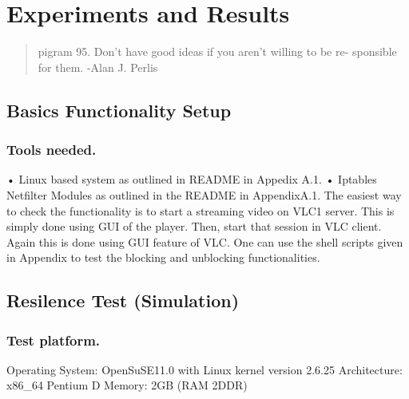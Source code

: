 \chapter{Experiments and Results}
\begin{quote}
pigram 95. Don’t have good ideas if you aren’t willing to be re-
sponsible for them.
-Alan J. Perlis
\end{quote}
\section{Basics Functionality Setup}
\subsection{Tools needed.}
• Linux based system as outlined in README in Appedix A.1.
• Iptables Netfilter Modules as outlined in the README in AppendixA.1.
The easiest way to check the functionality is to start a streaming video on VLC1
server. This is simply done using GUI of the player. Then, start that session in
VLC client. Again this is done using GUI feature of VLC. One can use the shell
scripts given in Appendix to test the blocking and unblocking functionalities.
\section{Resilence Test (Simulation)}
\subsection{Test platform.}
Operating System: OpenSuSE11.0 with Linux kernel version 2.6.25
Architecture: x86_64 Pentium D
Memory: 2GB (RAM 2DDR)

